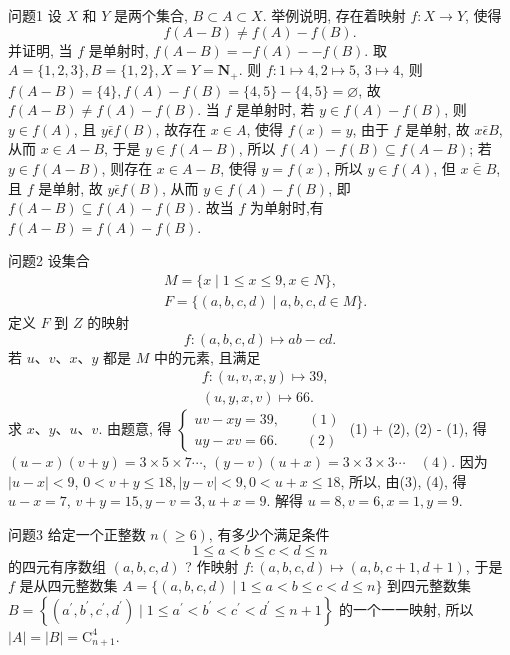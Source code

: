 
问题1 设 $X$ 和 $Y$ 是两个集合, $B \subset A \subset X$. 举例说明, 存在着映射 $f: X \rightarrow Y$, 使得
$$
f(A-B) \neq f(A)-f(B) .
$$
并证明, 当 $f$ 是单射时, $f(A-B)=-f(A)--f(B)$.
取 $A=\{1,2,3\}, B=\{1,2\}, X=Y=\mathbf{N}_{+}$. 则 $f: 1 \mapsto 4,2 \mapsto 5$, $3 \mapsto 4$, 则 $f(A-B)=\{4\}, f(A)-f(B)=\{4,5\}-\{4,5\}=\varnothing$, 故 $f(A- B) \neq f(A)-f(B)$. 当 $f$ 是单射时, 若 $y \in f(A)-f(B)$, 则 $y \in f(A)$, 且 $y \bar{\epsilon} f(B)$, 故存在 $x \in A$, 使得 $f(x)=y$, 由于 $f$ 是单射, 故 $x \bar{\epsilon} B$, 从而 $x \in A-B$, 于是 $y \in f(A-B)$, 所以 $f(A)-f(B) \subseteq f(A-B)$; 若 $y \in f(A- B)$, 则存在 $x \in A-B$, 使得 $y=f(x)$, 所以 $y \in f(A)$, 但 $x \bar{\in} B$, 且 $f$ 是单射, 故 $y \bar{\epsilon} f(B)$, 从而 $y \in f(A)-f(B)$, 即 $f(A-B) \subseteq f(A)-f(B)$. 故当 $f$ 为单射时,有 $f(A-B)=f(A)-f(B)$.



问题2 设集合
$$
\begin{aligned}
& M=\{x \mid 1 \leqslant x \leqslant 9, x \in N\}, \\
& F=\{(a, b, c, d) \mid a, b, c, d \in M\} .
\end{aligned}
$$
定义 $F$ 到 $Z$ 的映射
$$
f:(a, b, c, d) \mapsto a b-c d .
$$
若 $u 、 v 、 x 、 y$ 都是 $M$ 中的元素, 且满足
$$
\begin{aligned}
& f:(u, v, x, y) \mapsto 39, \\
& (u, y, x, v) \mapsto 66 .
\end{aligned}
$$
求 $x 、 y 、 u 、 v$.
由题意, 得 $\left\{\begin{array}{l}u v-x y=39, \quad\quad (1) \\ u y-x v=66 .\quad\quad (2) \end{array}\right.$
(1) + (2), (2) - (1), 得 $(u-x)(v+ y)=3 \times 5 \times 7 \cdots$, $(y-v)(u+x)=3 \times 3 \times 3 \cdots \quad (4)$. 因为 $|u-x|<9$, $0<v+y \leqslant 18,|y-v|<9,0<u+x \leqslant 18$, 所以, 由(3), (4), 得 $u-x=7$, $v+y=15, y-v=3, u+x=9$. 解得 $u=8, v=6, x=1, y=9$.



问题3 给定一个正整数 $n(\geqslant 6)$, 有多少个满足条件
$$
1 \leqslant a<b \leqslant c<d \leqslant n
$$
的四元有序数组 $(a, b, c, d)$ ?
作映射 $f:(a, b, c, d) \mapsto(a, b, c+1, d+1)$, 于是 $f$ 是从四元整数集 $A=\{(a, b, c, d) \mid 1 \leqslant a<b \leqslant c<d \leqslant n\}$ 到四元整数集 $B=\left\{\left(a^{\prime}, b^{\prime},c^{\prime}, d^{\prime}\right) \mid 1 \leqslant a^{\prime}<b^{\prime}<c^{\prime}<d^{\prime} \leqslant n+1\right\}$ 的一个一一映射, 所以 $|A|=|B|= \mathrm{C}_{n+1}^4$.



